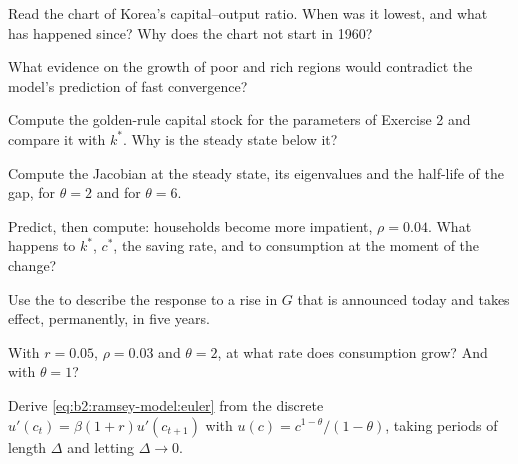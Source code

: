 \begin{exercise}[$\star$]\label{exo:b2:ramsey-model:3}
Read the chart of Korea's capital--output ratio. When was it lowest, and what has happened since? Why does the chart
not start in 1960?
\end{exercise}

\begin{exercise}[$\star$]\label{exo:b2:ramsey-model:4}
What evidence on the growth of poor and rich regions would contradict the model's prediction of fast convergence?
\end{exercise}

\begin{exercise}[$\star\star$]\label{exo:b2:ramsey-model:5}
Compute the golden-rule capital stock for the parameters of Exercise 2 and compare it with $k^*$. Why is the steady state below
it?
\end{exercise}

\begin{exercise}[$\star\star$]\label{exo:b2:ramsey-model:6}
Compute the Jacobian at the steady state, its eigenvalues and the half-life of the gap, for $\theta = 2$ and for $\theta = 6$.
\end{exercise}

\begin{exercise}[$\star\star$]\label{exo:b2:ramsey-model:7}
Predict, then compute: households become more impatient, $\rho = 0.04$. What happens to $k^*$, $c^*$, the saving rate, and to consumption at the moment
of the change?
\end{exercise}

\begin{exercise}[$\star\star$]\label{exo:b2:ramsey-model:8}
Use the  to describe the response to a rise in $G$ that is announced today and takes effect, permanently, in five
years.
\end{exercise}

\begin{exercise}[$\star\star$]\label{exo:b2:ramsey-model:9}
With $r = 0.05$, $\rho = 0.03$ and $\theta = 2$, at what rate does consumption grow? And with $\theta = 1$?
\end{exercise}

\begin{exercise}[$\star\star\star$]\label{exo:b2:ramsey-model:10}
Derive \eqref{eq:b2:ramsey-model:euler} from the discrete  $u'(c_t) = \beta(1 + r)u'(c_{t+1})$ with $u(c) = c^{1-\theta}/(1 - \theta)$, taking periods of length $\Delta$ and letting $\Delta \to 0$.
\end{exercise}

